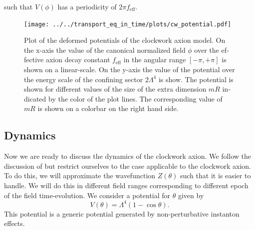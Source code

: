 \documentclass[master,       %
               twoside,        %
               BCOR10mm,       %
               english,ngerman, %
               ]{GAUBM}
\begin{document}
\begin{otherlanguage}{english}
such that $V(\phi)$ has a periodicity of $2 \pi f_\mathrm{eff}$.
\begin{figure}[H]
	\label{fig:clockwork_pot_plot}
    \texttt{[image: ../../transport\_eq\_in\_time/plots/cw\_potential.pdf]}
    \caption{Plot of the deformed potentials of the clockwork axion model. On the x-axis the value of the canonical normalized field $\phi$ over the effective axion decay constant $f_\mathrm{eff}$ in the angular range $[-\pi, +\pi]$ is shown on a linear-scale. On the y-axis the value of the potential over the energy scale of the confining sector $2 \Lambda^4$ is show. The potential is shown for different values of the size of the extra dimension $mR$ indicated by the color of the plot lines. The corresponding value of $mR$ is shown on a colorbar on the right hand side.}
\end{figure}

\subsection{Dynamics}
Now we are ready to discuss the dynamics of the clockwork axion.
We follow the discussion of \cite{Deformed_potential_Bae_2019} but restrict ourselves to the case applicable to the clockwork axion.
To do this, we will approximate the wavefunction $Z(\theta)$ such that it is easier to handle. We will do this in different field ranges corresponding to different epoch of the field time-evolution.
We consider a potential for $\theta$ given by
\begin{equation}
	V(\theta) = \Lambda^4(1 - \cos \theta).
\end{equation}
This potential is a generic potential generated by non-perturbative instanton effects.


\end{otherlanguage}
\end{document}
